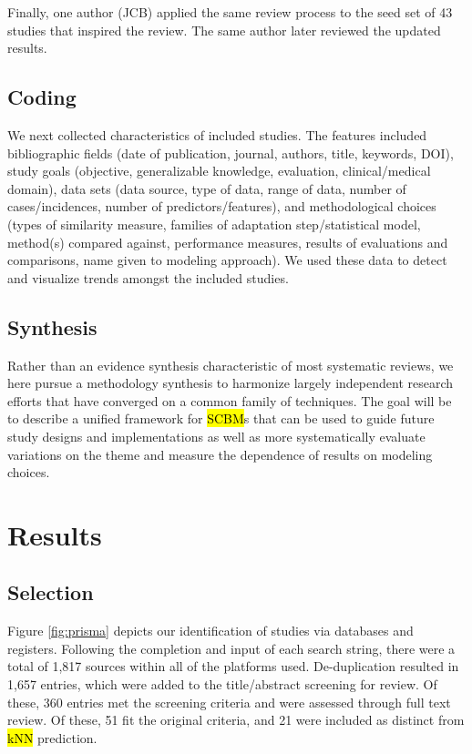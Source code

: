 \documentclass[sn-mathphys,Numbered,pdflatex]{sn-jnl}
\theoremstyle{remark}
\theoremstyle{definition}
\begin{document}
Finally, one author (JCB) applied the same review process to the seed
set of 43 studies that inspired the review. The same author later
reviewed the updated results.

\subsection{Coding}\label{coding}

We next collected characteristics of included studies. The features
included bibliographic fields (date of publication, journal, authors,
title, keywords, DOI), study goals (objective, generalizable knowledge,
evaluation, clinical/medical domain), data sets (data source, type of
data, range of data, number of cases/incidences, number of
predictors/features), and methodological choices (types of similarity
measure, families of adaptation step/statistical model, method(s)
compared against, performance measures, results of evaluations and
comparisons, name given to modeling approach). We used these data to
detect and visualize trends amongst the included studies.

\subsection{Synthesis}\label{synthesis}

Rather than an evidence synthesis characteristic of most systematic
reviews, we here pursue a methodology synthesis to harmonize largely
independent research efforts that have converged on a common family of
techniques. The goal will be to describe a unified framework for
\hl{SCBM}s that can be used to guide future study designs and
implementations as well as more systematically evaluate variations on
the theme and measure the dependence of results on modeling choices.

\section{Results}\label{results}

\subsection{Selection}\label{selection}

Figure \ref{fig:prisma} depicts our identification of studies via
databases and registers. Following the completion and input of each
search string, there were a total of 1,817 sources within all of the
platforms used. De-duplication resulted in 1,657 entries, which were
added to the title/abstract screening for review. Of these, 360 entries
met the screening criteria and were assessed through full text review.
Of these, 51 fit the original criteria, and 21 were included as distinct
from \hl{kNN} prediction.
\end{document}
